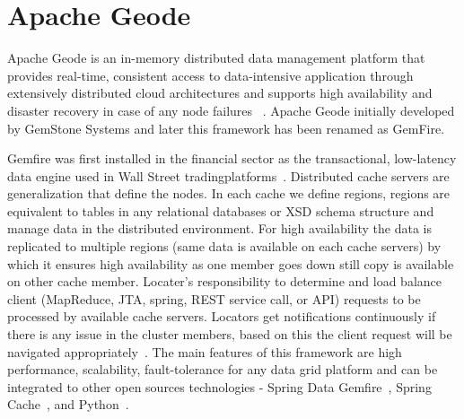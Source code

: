 \section{Apache Geode}

Apache Geode is an in-memory distributed 
data management platform that provides 
real-time, consistent access to data-intensive
application through extensively distributed cloud
architectures and supports high availability and
disaster recovery in case of any node failures
~\cite{hid-sp18-514-apachegeodewiki}. 
Apache Geode initially developed by GemStone Systems
and later this framework has been renamed as GemFire.

Gemfire was first installed in 
the financial sector as the transactional,
low-latency data engine used in Wall Street 
tradingplatforms~\cite{hid-sp18-514-apachegeodewiki}.
Distributed cache servers are generalization
that define the nodes. In each cache we 
define regions, regions are 
equivalent to tables in any relational 
databases or XSD schema structure 
and manage data in the distributed environment. 
For high availability the data is replicated 
to multiple regions (same data is available 
on each cache servers) by which it ensures 
high availability as one member goes down still copy
is available on other cache member. 
Locater's responsibility to determine 
and load balance client (MapReduce, JTA, 
spring, REST service call, or API) requests 
to be processed by available cache servers. 
Locators get notifications continuously 
if there is any issue in the cluster members, 
based on this the client request will be navigated
appropriately~\cite{hid-sp18-514-apachegeodewiki}.
The main features of this framework are high performance, 
scalability, fault-tolerance for any data grid platform and 
can be integrated to other open sources
technologies - Spring Data
Gemfire~\cite{hid-sp18-514-geodespringgemfire}, Spring
Cache~\cite{hid-sp18-514-geodespringcache}, and
Python~\cite{hid-sp18-514-geodepython}.